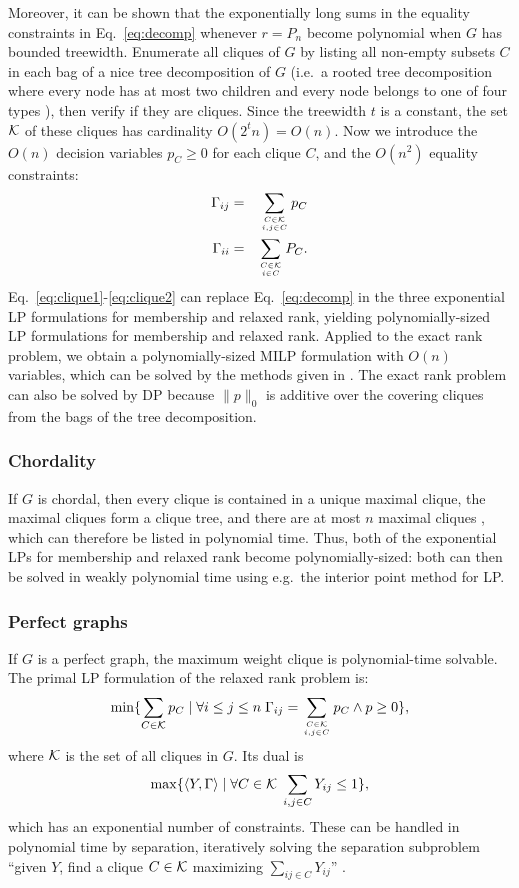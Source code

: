 \documentclass[envcountsect,envcountsame]{svjour3}
\theoremstyle{changebreak}                %
\def\K{{\cal K}}
\begin{document}
Moreover, it can be shown that the exponentially long sums in the equality constraints in Eq.~\eqref{eq:decomp} whenever $r=P_n$ become polynomial when $G$ has bounded treewidth. Enumerate all cliques of $G$ by listing all non-empty subsets $C$ in each bag of a nice tree decomposition of $G$ (i.e.~a rooted tree decomposition where every node has at most two children and every node belongs to one of four types \cite{kloks}), then verify if they are cliques. Since the treewidth $t$ is a constant, the set $\K$ of these cliques has cardinality $O(2^tn)=O(n)$. Now we introduce the $O(n)$ decision variables $p_C\ge 0$ for each clique $C$, and the $O(n^2)$ equality constraints:
\begin{eqnarray}
\Gamma_{ij} &=& \sum_{C \in \K\atop i,j\in C} p_C \label{eq:clique1} \\
\Gamma_{ii} &=& \sum_{C \in \K\atop i\in C} P_C. \label{eq:clique2}
\end{eqnarray}
Eq.~\eqref{eq:clique1}-\eqref{eq:clique2} can replace Eq.~\eqref{eq:decomp} in the three exponential LP formulations for membership and relaxed rank, yielding polynomially-sized LP formulations for membership and relaxed rank. Applied to the exact rank problem, we obtain a polynomially-sized MILP formulation with $O(n)$ variables, which can be solved by the methods given in \cite{chan}. The exact rank problem can also be solved by DP \cite{bodlaender2} because $\|p\|_0$ is additive over the covering cliques from the bags of the tree decomposition.

\subsubsection{Chordality}
If $G$ is chordal, then every clique is contained in a unique maximal clique, the maximal cliques form a clique tree, and there are at most $n$ maximal cliques \cite{chordalGraph}, which can therefore be listed in polynomial time. Thus, both of the exponential LPs for membership and relaxed rank become polynomially-sized: both can then be solved in weakly polynomial time using e.g.~the interior point method for LP.

\subsubsection{Perfect graphs}
If $G$ is a perfect graph, the maximum weight clique is polynomial-time solvable. The primal LP formulation of the relaxed rank problem is:
\[\min \{\sum_{C\in\K} p_C \;|\; \forall i\le j\le n\; \Gamma_{ij}=\sum_{C\in\K\atop i,j\in C} p_C\land p\ge 0\},\]
where $\K$ is the set of all cliques in $G$. Its dual is
\[\max \{\langle Y,\Gamma\rangle \;|\;\forall C\in\K \;\sum_{i,j\in C} Y_{ij}\le 1\},\]
which has an exponential number of constraints. These can be handled in polynomial time by separation, iteratively solving the separation subproblem ``given $Y$, find a clique $C\in\K$ maximizing $\sum_{ij\in C} Y_{ij}$'' \cite{perfectGraph}. 
\end{document}
